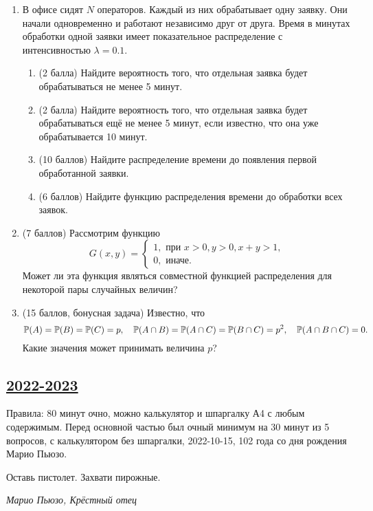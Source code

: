 \begin{enumerate}
 \item В офисе сидят $N$ операторов. 
Каждый из них обрабатывает одну заявку. 
Они начали одновременно и работают независимо друг от друга. 
Время в минутах обработки одной заявки имеет показательное распределение с интенсивностью $\lambda = 0.1$. 
\begin{enumerate}
\item (2 балла) Найдите вероятность того, что отдельная заявка будет обрабатываться не менее 5 минут.
\item (2 балла) Найдите вероятность того, что отдельная заявка будет обрабатываться ещё не менее 5 минут, 
если известно, что она уже обрабатывается 10 минут.
\item (10 баллов) Найдите распределение времени до появления первой обработанной заявки.
\item (6 баллов) Найдите функцию распределения времени до обработки всех заявок.
\end{enumerate}

 \item (7 баллов) Рассмотрим функцию
\[
G(x,y) = 
\begin{cases}
1, \text{ при } x > 0, y > 0, x + y > 1, \\
0, \text{ иначе.}
\end{cases}
\]
Может ли эта функция являться совместной функцией распределения для некоторой пары случайных величин? 

 \item (15 баллов, бонусная задача) 
 Известно, что 
 \[
  \P(A) = \P(B) = \P(C) = p, \quad \P(A \cap B) = \P(A \cap C) = \P(B \cap C) = p^2, \quad \P(A \cap B \cap C) = 0.
 \]
 Какие значения может принимать величина $p$?


\end{enumerate}




\subsection[2022-2023]{\hyperref[sec:sol_kr_01_ip_2022_2023]{2022-2023}}
\label{sec:kr_01_ip_2022_2023}

Правила: 80 минут очно, можно калькулятор и шпаргалку А4 с любым содержимым. 
Перед основной частью был очный минимум на 30 минут из 5 вопросов, с калькулятором без шпаргалки, 2022-10-15, 
102 года со дня рождения Марио Пьюзо.

  \begin{center}
      Оставь пистолет. Захвати пирожные. 
  \end{center}
  \begin{flushright}
      \textit{Марио Пьюзо, Крёстный отец}
  \end{flushright}
  
